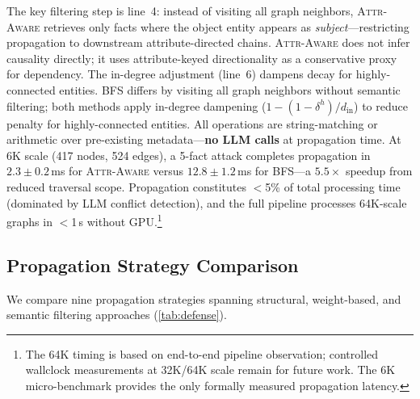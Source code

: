 \documentclass{article}
\newcommand{\attraware}{\textsc{Attr-Aware}}
\newcommand{\bfsprop}{\textsc{BFS}}
\begin{document}
The key filtering step is line~4: instead of visiting all graph neighbors, \attraware{} retrieves only facts where the object entity appears as \textit{subject}---restricting propagation to downstream attribute-directed chains.
\attraware{} does not infer causality directly; it uses attribute-keyed directionality as a conservative proxy for dependency.
The in-degree adjustment (line~6) dampens decay for highly-connected entities.
\bfsprop{} differs by visiting all graph neighbors without semantic filtering; both methods apply in-degree dampening ($1 - (1-\delta^h)/d_{\text{in}}$) to reduce penalty for highly-connected entities.
All operations are string-matching or arithmetic over pre-existing metadata---\textbf{no LLM calls} at propagation time.
At 6K scale (417 nodes, 524 edges), a 5-fact attack completes propagation in $2.3\pm0.2$\,ms for \attraware{} versus $12.8\pm1.2$\,ms for BFS---a $5.5\times$ speedup from reduced traversal scope.
Propagation constitutes $<$5\% of total processing time (dominated by LLM conflict detection), and the full pipeline processes 64K-scale graphs in $<$1\,s without GPU.\footnote{The 64K timing is based on end-to-end pipeline observation; controlled wallclock measurements at 32K/64K scale remain for future work.  The 6K micro-benchmark provides the only formally measured propagation latency.}

\subsection{Propagation Strategy Comparison}

We compare nine propagation strategies spanning structural, weight-based, and semantic filtering approaches (\cref{tab:defense}).
\end{document}
